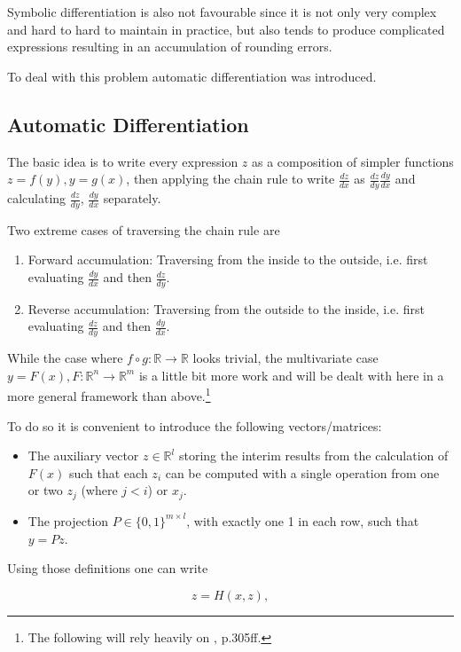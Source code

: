 \documentclass[12pt]{article}
\theoremstyle{definition}\newtheorem*{definition}{Definition}
\theoremstyle{definition}\newtheorem*{remark}{Remark}
\begin{document}
Symbolic differentiation is also not favourable since it is not only very complex and hard to hard to maintain in practice, but also tends to produce complicated expressions resulting in an accumulation of rounding errors.

To deal with this problem automatic differentiation was introduced.

\subsection{Automatic Differentiation}
The basic idea is to write every expression $z$ as a composition of simpler functions $z=f(y), y=g(x)$, then applying the chain rule to write $\frac{dz}{dx}$ as $\frac{dz}{dy}\frac{dy}{dx}$ and calculating $\frac{dz}{dy}$, $\frac{dy}{dx}$ separately.

Two extreme cases of traversing the chain rule are
\begin{enumerate}
	\item Forward accumulation: Traversing from the inside to the outside, i.e. first evaluating $\frac{dy}{dx}$ and then $\frac{dz}{dy}$.
	\item Reverse accumulation: Traversing from the outside to the inside, i.e. first evaluating $\frac{dz}{dy}$ and then $\frac{dy}{dx}$.
\end{enumerate}

While the case where $f\circ g : \mathbb R \rightarrow \mathbb R$ looks trivial, the multivariate case $y = F(x), F:\mathbb R^n \rightarrow \mathbb R^m$ is a little bit more work and will be dealt with here in a more general framework than above.\footnote{The following will rely heavily on \cite{Neumaier01}, p.305ff.}

To do so it is convenient to introduce the following vectors/matrices:

\begin{itemize}
	\item The auxiliary vector $z\in\mathbb R^l$ storing the interim results from the calculation of $F(x)$ such that each $z_i$ can be computed with a single operation from one or two $z_j$ (where $j<i$) or $x_j$.
	\item The projection $P\in\{0,1\}^{m\times l}$, with exactly one 1 in each row, such that $y=Pz$.
\end{itemize}

Using those definitions one can write 

\begin{equation}\label{eq:autodiff_z_as_H}
	z=H(x,z),
\end{equation}
\end{document}
